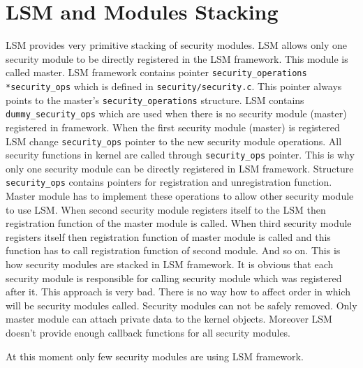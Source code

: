 \section{LSM and Modules Stacking}
LSM provides very primitive stacking of security modules. LSM allows only one security
module to be directly registered in the LSM framework. This module is called master.
LSM framework contains pointer \texttt{security\_operations *security\_ops} which is
defined in \texttt{security/security.c}. This pointer always points to the master's
\texttt{security\_operations} structure. LSM contains \texttt{dummy\_security\_ops}
which are used when there is no security module (master) registered in framework. When
the first security module (master) is registered LSM change \texttt{security\_ops} pointer to
the new security module operations. All security functions in kernel are called through
\texttt{security\_ops} pointer. This is why only one security module can be directly registered
in LSM framework. Structure \texttt{security\_ops} contains pointers for registration
and unregistration function. Master module has to implement these operations to allow other
security module to use LSM. When second security module registers itself to the LSM
then registration function of the master module is called. When third security module
registers itself then registration function of master module is called and this
function has to call registration function of second module. And so on. This is how
security modules are stacked in LSM framework. It is obvious that each security module
is responsible for calling security module which was registered after it. This
approach is very bad. There is no way how to affect order in which will be security
modules called. Security modules can not be safely removed. Only master module can
attach private data to the kernel objects. Moreover LSM doesn't provide enough
callback functions for all security modules.

At this moment only few security modules are using LSM framework. 

